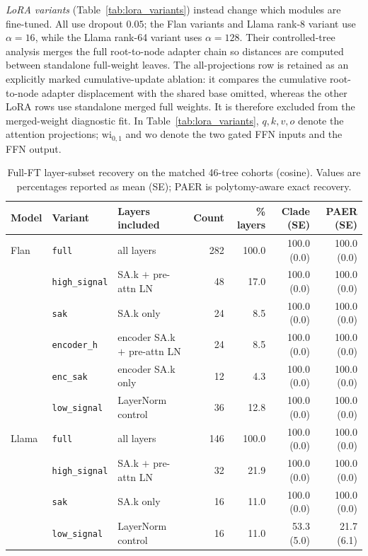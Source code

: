\documentclass{article}
\theoremstyle{definition}
\theoremstyle{plain}
\begin{document}
\emph{LoRA variants} (Table~\ref{tab:lora_variants}) instead change which modules are fine-tuned.
All use dropout $0.05$; the Flan variants and Llama rank-8 variant use $\alpha=16$, while the Llama
rank-64 variant uses $\alpha=128$. Their controlled-tree analysis merges the full
root-to-node adapter chain so distances are computed between standalone full-weight leaves. The
all-projections row is retained as an explicitly marked cumulative-update ablation: it compares the
cumulative root-to-node adapter displacement with the shared base omitted, whereas the other LoRA rows
use standalone merged full weights. It is therefore excluded from the merged-weight diagnostic fit.
In Table~\ref{tab:lora_variants}, $q,k,v,o$ denote the attention projections; $\mathrm{wi}_{0,1}$
and $\mathrm{wo}$ denote the two gated FFN inputs and the FFN output.

\begin{table}[h]
\caption{Full-FT layer-subset recovery on the matched 46-tree cohorts (cosine). Values are
percentages reported as mean (SE); PAER is polytomy-aware exact recovery.}
\label{tab:layer_subsets}
\centering
\scriptsize
\setlength{\tabcolsep}{2pt}
\begin{tabular}{lllrrrr}
\toprule
Model & Variant & Layers included & Count & \% layers & Clade (SE) & PAER (SE) \\
\midrule
Flan & \texttt{full}         & all layers                                  & 282 & 100.0 & 100.0 (0.0) & 100.0 (0.0) \\
     & \texttt{high\_signal} & SA.k $+$ pre-attn LN                        & 48  & 17.0  & 100.0 (0.0) & 100.0 (0.0) \\
     & \texttt{sak}          & SA.k only                                    & 24  & 8.5   & 100.0 (0.0) & 100.0 (0.0) \\
     & \texttt{encoder\_h}   & encoder SA.k $+$ pre-attn LN                 & 24  & 8.5   & 100.0 (0.0) & 100.0 (0.0) \\
     & \texttt{enc\_sak}     & encoder SA.k only                            & 12  & 4.3   & 100.0 (0.0) & 100.0 (0.0) \\
     & \texttt{low\_signal}  & LayerNorm control                            & 36  & 12.8  & 100.0 (0.0) & 100.0 (0.0) \\
\midrule
Llama & \texttt{full}         & all layers                                  & 146 & 100.0 & 100.0 (0.0) & 100.0 (0.0) \\
      & \texttt{high\_signal} & SA.k $+$ pre-attn LN                        & 32  & 21.9  & 100.0 (0.0) & 100.0 (0.0) \\
      & \texttt{sak}          & SA.k only                                    & 16  & 11.0  & 100.0 (0.0) & 100.0 (0.0) \\
      & \texttt{low\_signal}  & LayerNorm control                            & 16  & 11.0  & 53.3 (5.0)  & 21.7 (6.1) \\
\bottomrule
\end{tabular}
\end{table}
\end{document}
